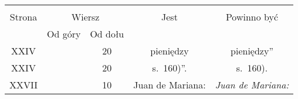 \documentclass[a4paper,11pt]{article}
\begin{document}
\begin{center}

  \begin{tabular}{|c|c|c|c|c|}
    \hline
    & \multicolumn{2}{c|}{} & & \\
    Strona & \multicolumn{2}{c|}{Wiersz} & Jest
                              & Powinno być \\ \cline{2-3}
    & Od góry & Od dołu & & \\
    \hline
    XXIV  & & 20 & pieniędzy & pieniędzy” \\
    XXIV  & & 20 & s.~160)”. & s.~160). \\
    XXVII & & 10 & Juan de Mariana: & \textit{Juan de Mariana:} \\
    \hline
  \end{tabular}






\end{center}
\end{document}
